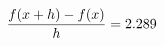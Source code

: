 \documentclass[preview]{standalone}
\begin{document}
\begin{align*}
\special{dvisvgm:raw <g id='unique000'>}\frac{f(x+h)-f(x)}{h} = 2.289\special{dvisvgm:raw </g>}
\end{align*}
\end{document}
